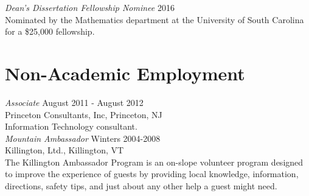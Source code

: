 \documentclass{article}
\begin{document}
\noindent\textsl{Dean's Dissertation Fellowship Nominee} \hfill 2016\\
Nominated by the Mathematics department at the University of South Carolina for a \$25,000 fellowship.


\section*{Non-Academic Employment}             
\textsl{Associate} \hfill August 2011 - August 2012\\
Princeton Consultants, Inc, Princeton, NJ\\
Information Technology consultant.\\

\noindent\textsl{Mountain Ambassador} \hfill Winters 2004-2008\\
Killington, Ltd., Killington, VT \\
The Killington Ambassador Program is an on-slope volunteer program
designed to improve the experience of guests by providing local knowledge, 
information, directions, safety tips, and just about any other help a guest might need.

\end{document}
